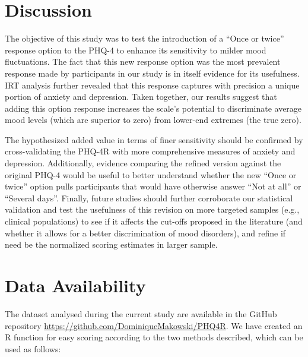 \documentclass[
  man,floatsintext]{apa6}
\begin{document}
\hypertarget{discussion}{%
\section{Discussion}\label{discussion}}

The objective of this study was to test the introduction of a ``Once or twice'' response option to the PHQ-4 to enhance its sensitivity to milder mood fluctuations. The fact that this new response option was the most prevalent response made by participants in our study is in itself evidence for its usefulness. IRT analysis further revealed that this response captures with precision a unique portion of anxiety and depression. Taken together, our results suggest that adding this option response increases the scale's potential to discriminate average mood levels (which are superior to zero) from lower-end extremes (the true zero).

The hypothesized added value in terms of finer sensitivity should be confirmed by cross-validating the PHQ-4R with more comprehensive measures of anxiety and depression. Additionally, evidence comparing the refined version against the original PHQ-4 would be useful to better understand whether the new ``Once or twice'' option pulls participants that would have otherwise answer ``Not at all'' or ``Several days''. Finally, future studies should further corroborate our statistical validation and test the usefulness of this revision on more targeted samples (e.g., clinical populations) to see if it affects the cut-offs proposed in the literature (and whether it allows for a better discrimination of mood disorders), and refine if need be the normalized scoring estimates in larger sample.

\newpage

\hypertarget{data-availability}{%
\section{Data Availability}\label{data-availability}}

The dataset analysed during the current study are available in the GitHub repository \url{https://github.com/DominiqueMakowski/PHQ4R}. We have created an R function for easy scoring according to the two methods described, which can be used as follows:
\end{document}
